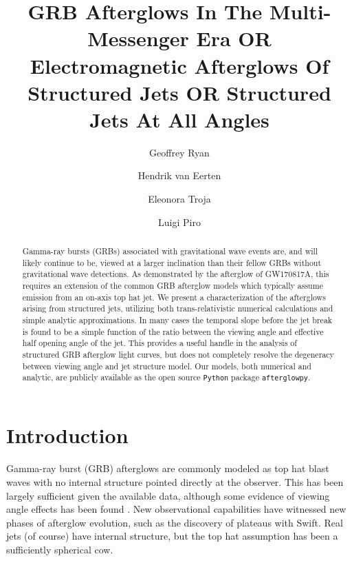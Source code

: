 \documentclass[twocolumn]{aastex62}
\newcommand{\gwbns}{GW170817A}
\newcommand{\afterglowpy}{{\tt afterglowpy}}
\newcommand{\python}{{\tt Python}}
\begin{document}
\title{GRB Afterglows In The Multi-Messenger Era  OR  Electromagnetic Afterglows Of Structured Jets  OR  Structured Jets At All Angles}

\author[0000-0001-9068-7157]{Geoffrey Ryan}

\author{Hendrik van Eerten}

\author{Eleonora Troja}

\author{Luigi Piro}


\begin{abstract}
	Gamma-ray bursts (GRBs) associated with gravitational wave events are, and will likely continue to be, viewed at a larger inclination than their fellow GRBs without gravitational wave detections.  As demonstrated by the afterglow of \gwbns{}, this requires an extension of the common GRB afterglow models which typically assume emission from an on-axis top hat jet.  We present a characterization of the afterglows arising from structured jets, utilizing both trans-relativistic numerical calculations and simple analytic approximations.  In many cases the temporal slope before the jet break is found to be a simple function of the ratio between the viewing angle and effective half opening angle of the jet.  This provides a useful handle in the analysis of structured GRB afterglow light curves, but does not completely resolve the degeneracy between viewing angle and jet structure model.  Our models, both numerical and analytic, are publicly available as the open source \python{} package \afterglowpy{}.
	
\end{abstract}

\section{Introduction}

Gamma-ray burst (GRB) afterglows are commonly modeled as top hat blast waves with no internal structure pointed directly at the observer. This has been largely sufficient given the available data, although some evidence of viewing angle effects has been found \citep{Ryan:2015aa}.  New observational capabilities have witnessed new phases of afterglow evolution, such as the discovery of plateaus with Swift.  Real jets (of course) have internal structure, but the top hat assumption has been a sufficiently spherical cow. 
\end{document}
